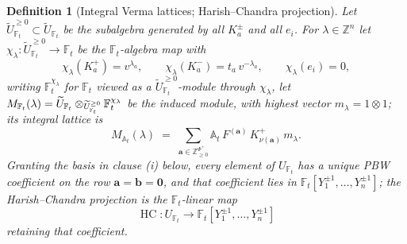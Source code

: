 \documentclass[11pt]{article}
\newtheorem{definition}{Definition}
\newcommand{\At}{\mathbb A_t}
\newcommand{\Ft}{\mathbb F_t}
\newcommand{\HC}{\operatorname{HC}}
\begin{document}
\begin{definition}[Integral Verma lattices; Harish--Chandra
projection]\label{def:verma-hc}
Let $\widetilde U_{\Ft}^{\ge0}\subset\widetilde U_{\Ft}$ be the subalgebra
generated by all $K_a^{\pm}$ and all $e_i$.  For $\lambda\in\mathbb Z^{n}$
let $\chi_\lambda:\widetilde U_{\Ft}^{\ge0}\to\Ft$ be the $\Ft$-algebra map
with
\[
  \chi_\lambda(K_a^{+})=v^{\lambda_a},\qquad
  \chi_\lambda(K_a^{-})=t_a\,v^{-\lambda_a},\qquad
  \chi_\lambda(e_i)=0,
\]
writing $\Ft^{\chi_\lambda}$ for $\Ft$ viewed as a
$\widetilde U_{\Ft}^{\ge0}$-module through $\chi_\lambda$, let
$M_{\Ft}(\lambda)
=\widetilde U_{\Ft}\otimes_{\smash{\widetilde U_{\Ft}^{\ge0}}}\Ft^{\chi_\lambda}$
be the induced module, with highest vector $m_\lambda=1\otimes1$; its
integral lattice is
\[
  M_{\At}(\lambda)\;=\;\sum_{\mathbf a\in\mathbb Z_{\ge0}^{\Phi^{+}}}
  \At\,F^{(\mathbf a)}\,K^{+}_{\nu(\mathbf a)}\,m_\lambda .
\]
Granting the basis in clause (i) below, every element of $U_{\Ft}$ has a
unique PBW coefficient on the row $\mathbf a=\mathbf b=\mathbf 0$, and that
coefficient lies in $\Ft[Y_1^{\pm1},\ldots,Y_n^{\pm1}]$; the
\emph{Harish--Chandra projection} is the $\Ft$-linear map
\[
  \HC:U_{\Ft}\longrightarrow\Ft[Y_1^{\pm1},\ldots,Y_n^{\pm1}]
\]
retaining that coefficient.
\end{definition}
\end{document}
